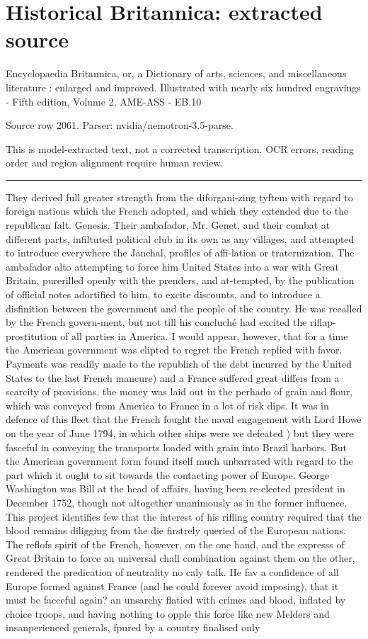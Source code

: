\documentclass[11pt]{article}
\begin{document}
\section*{Historical Britannica: extracted source}
Encyclopaedia Britannica, or, a Dictionary of arts, sciences, and miscellaneous literature : enlarged and improved. Illustrated with nearly six hundred engravings - Fifth edition, Volume 2, AME-ASS - EB.10\par
{\small Source row 2061. Parser: nvidia/nemotron-3.5-parse.\par}
{\small This is model-extracted text, not a corrected transcription. OCR errors, reading order and region alignment require human review.\par}
\hrule\medskip
They derived full greater strength from the diforgani-zing tyftem with regard to foreign nations which the French adopted, and which they extended due to the republican falt. Genesis. Their ambafador, Mr. Genet, and their combat at different parts, infiltuted political club in its own as any villages, and attempted to introduce everywhere the Janchal, profiles of affi-lation or traternization. The ambafador alto attempting to force him United States into a war with Great Britain, purerilled openly with the prenders, and at-tempted, by the publication of official notes adortified to him, to excite discounts, and to introduce a disfinition between the government and the people of the country. He was recalled by the French govern-ment, but not till his concluché had excited the riflap-prostitution of all parties in America. I would appear, however, that for a time the American government was elipted to regret the French replied with favor. Payments was readily made to the republish of the debt incurred by the United States to the last French mancure) and a France suffered great differs from a scarcity of provisions, the money was laid out in the perhado of grain and flour, which was conveyed from America to France in a lot of risk dips. It was in defence of this fleet that the French fought the naval engagement with Lord Howe on the year of June 1794, in which other ships were we defeated ) but they were fasceful in conveying the transports loaded with grain into Brazil harbors. But the American government form found itself much unbarrated with regard to the part which it ought to sit towards the contacting power of Europe. George Washington was Bill at the head of affairs, having been re-elected president in December 1752, though not altogether unanimously as in the former influence. This project identifies few that the interest of his rifling country required that the blood remains diligging from the die firstrely queried of the European nations. The reflofs spirit of the French, however, on the one hand, and the expresss of Great Britain to force an universal chall combination against them on the other, rendered the predication of neutrality no caly talk. He fav a confidence of all Europe formed against France (and he could forever avoid imposing), that it must be facceful again? an unsarchy flatied with crimes and blood, inflated by choice troops, and having nothing to opple this force like new Melders and insanperienced generals, fpured by a country finalised only 
\end{document}
